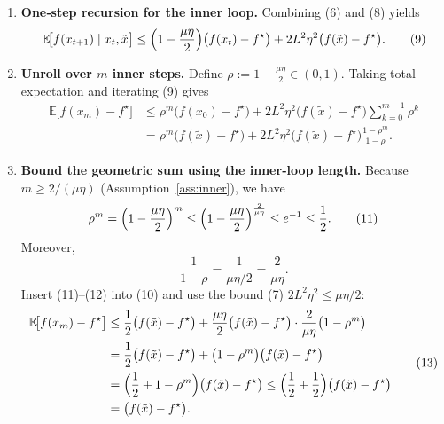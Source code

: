 \documentclass{article}
\newcommand{\E}{\mathbb{E}}
\begin{document}
\begin{enumerate}[label=[Step \arabic*], leftmargin=*]
\item \textbf{One‑step recursion for the inner loop.}  
Combining (6) and (8) yields
\[
\E\!\bigl[f(x_{t+1})\mid x_t,\tilde{x}\bigr]
\le \Bigl(1-\frac{\mu\eta}{2}\Bigr)\bigl(f(x_t)-f^{\star}\bigr)
   +2L^{2}\eta^{2}\bigl(f(\tilde{x})-f^{\star}\bigr).
\tag{9}
\]

\item \textbf{Unroll over $m$ inner steps.}  
Define $\rho:=1-\frac{\mu\eta}{2}\in(0,1)$. Taking total expectation and iterating (9) gives
\[
\begin{aligned}
\E\!\bigl[f(x_{m})-f^{\star}\bigr]
&\le \rho^{m}\bigl(f(x_{0})-f^{\star}\bigr)
   +2L^{2}\eta^{2}\bigl(f(\tilde{x})-f^{\star}\bigr)\sum_{k=0}^{m-1}\rho^{k}\\
&= \rho^{m}\bigl(f(\tilde{x})-f^{\star}\bigr)
   +2L^{2}\eta^{2}\bigl(f(\tilde{x})-f^{\star}\bigr)\frac{1-\rho^{m}}{1-\rho}.
\end{aligned}
\tag{10}
\]

\item \textbf{Bound the geometric sum using the inner‑loop length.}  
Because $m\ge 2/(\mu\eta)$ (Assumption~\ref{ass:inner}), we have
\[
\rho^{m}=\Bigl(1-\frac{\mu\eta}{2}\Bigr)^{m}
\le\Bigl(1-\frac{\mu\eta}{2}\Bigr)^{\frac{2}{\mu\eta}}
\le e^{-1}\le\frac12 .
\tag{11}
\]
Moreover,
\[
\frac{1}{1-\rho}= \frac{1}{\mu\eta/2}= \frac{2}{\mu\eta}.
\tag{12}
\]
Insert (11)–(12) into (10) and use the bound (7) $2L^{2}\eta^{2}\le\mu\eta/2$:
\[
\begin{aligned}
\E\!\bigl[f(x_{m})-f^{\star}\bigr]
&\le \frac12\bigl(f(\tilde{x})-f^{\star}\bigr)
   +\frac{\mu\eta}{2}\bigl(f(\tilde{x})-f^{\star}\bigr)\cdot\frac{2}{\mu\eta}\bigl(1-\rho^{m}\bigr)\\
&= \frac12\bigl(f(\tilde{x})-f^{\star}\bigr)
   +\bigl(1-\rho^{m}\bigr)\bigl(f(\tilde{x})-f^{\star}\bigr)\\
&= \Bigl(\frac12+1-\rho^{m}\Bigr)\bigl(f(\tilde{x})-f^{\star}\bigr)
   \le \Bigl(\frac12+\frac12\Bigr)\bigl(f(\tilde{x})-f^{\star}\bigr)\\
&= \bigl(f(\tilde{x})-f^{\star}\bigr).
\end{aligned}
\tag{13}
\]


\end{enumerate}
\end{document}
